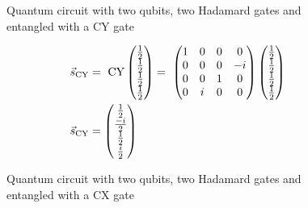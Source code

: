 
\begin{figure}[!h]
    \centering
    \caption{Quantum circuit with two qubits, two Hadamard gates and entangled with a $\mathrm{CY}$ gate}
    \label{fig:cy_entanglement}
\end{figure}


\begin{equation}
    \centering
    \begin{split}
        \vec{s}_{\mathrm{CY}} &=\ \mathrm{CY}\begin{pmatrix}
            \frac{1}{2}\\\frac{1}{2}\\\frac{1}{2}\\\frac{1}{2}
        \end{pmatrix} =\  \begin{pmatrix}
        1 & 0 & 0 & 0 \\
        0 & 0 & 0 & -i \\
        0 & 0 & 1 & 0 \\
        0 & i & 0 & 0
    \end{pmatrix}\begin{pmatrix}
            \frac{1}{2}\\\frac{1}{2}\\\frac{1}{2}\\\frac{1}{2}
        \end{pmatrix} \\
        \vec{s}_{\mathrm{CY}} &= \begin{pmatrix}
            \frac{1}{2}\\\frac{-i}{2}\\\frac{1}{2}\\\frac{i}{2}
        \end{pmatrix}
    \end{split}
    \label{equation:cy_entanglement}
\end{equation}


\begin{figure}[!h]
    \centering
    \caption{Quantum circuit with two qubits, two Hadamard gates and entangled with a $\mathrm{CX}$ gate}
    \label{fig:cx_entanglement}
\end{figure}

